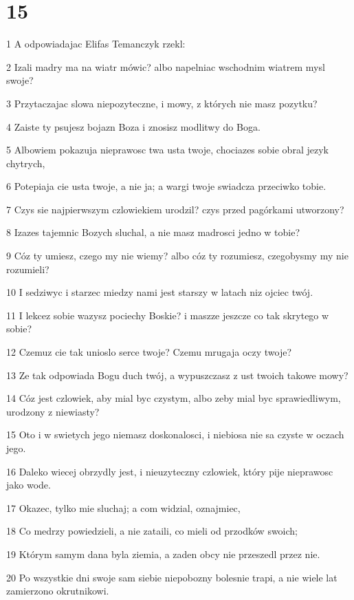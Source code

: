 \chapter{15}

\par 1 A odpowiadajac Elifas Temanczyk rzekl:
\par 2 Izali madry ma na wiatr mówic? albo napelniac wschodnim wiatrem mysl swoje?
\par 3 Przytaczajac slowa niepozyteczne, i mowy, z których nie masz pozytku?
\par 4 Zaiste ty psujesz bojazn Boza i znosisz modlitwy do Boga.
\par 5 Albowiem pokazuja nieprawosc twa usta twoje, chociazes sobie obral jezyk chytrych,
\par 6 Potepiaja cie usta twoje, a nie ja; a wargi twoje swiadcza przeciwko tobie.
\par 7 Czys sie najpierwszym czlowiekiem urodzil? czys przed pagórkami utworzony?
\par 8 Izazes tajemnic Bozych sluchal, a nie masz madrosci jedno w tobie?
\par 9 Cóz ty umiesz, czego my nie wiemy? albo cóz ty rozumiesz, czegobysmy my nie rozumieli?
\par 10 I sedziwyc i starzec miedzy nami jest starszy w latach niz ojciec twój.
\par 11 I lekcez sobie wazysz pociechy Boskie? i maszze jeszcze co tak skrytego w sobie?
\par 12 Czemuz cie tak unioslo serce twoje? Czemu mrugaja oczy twoje?
\par 13 Ze tak odpowiada Bogu duch twój, a wypuszczasz z ust twoich takowe mowy?
\par 14 Cóz jest czlowiek, aby mial byc czystym, albo zeby mial byc sprawiedliwym, urodzony z niewiasty?
\par 15 Oto i w swietych jego niemasz doskonalosci, i niebiosa nie sa czyste w oczach jego.
\par 16 Daleko wiecej obrzydly jest, i nieuzyteczny czlowiek, który pije nieprawosc jako wode.
\par 17 Okazec, tylko mie sluchaj; a com widzial, oznajmiec,
\par 18 Co medrzy powiedzieli, a nie zataili, co mieli od przodków swoich;
\par 19 Którym samym dana byla ziemia, a zaden obcy nie przeszedl przez nie.
\par 20 Po wszystkie dni swoje sam siebie niepobozny bolesnie trapi, a nie wiele lat zamierzono okrutnikowi.
